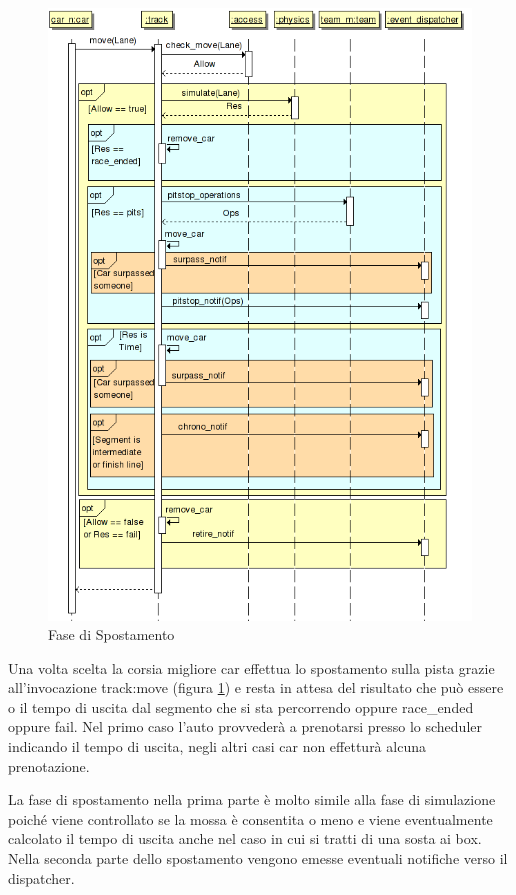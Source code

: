 \documentclass[11pt,a4paper]{report}
\begin{document}
\begin{figure}
\includegraphics[width=\textwidth]{diagrammi/Move}
\caption{Fase di Spostamento}
\label{fig:move}
\end{figure}

Una volta scelta la corsia migliore car effettua lo spostamento sulla pista grazie all'invocazione track:move (figura \ref{fig:move}) e resta in attesa del risultato che può essere o il tempo di uscita dal segmento che si sta percorrendo oppure race\_ended oppure fail. Nel primo caso l'auto provvederà a prenotarsi presso lo scheduler indicando il tempo di uscita, negli altri casi car non effetturà alcuna prenotazione.

La fase di spostamento nella prima parte è molto simile alla fase di simulazione poiché viene controllato se la mossa è consentita o meno e viene eventualmente calcolato il tempo di uscita anche nel caso in cui si tratti di una sosta ai box. Nella seconda parte dello spostamento vengono emesse eventuali notifiche verso il dispatcher.
\end{document}
